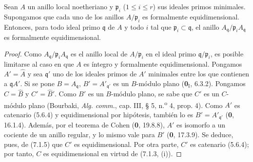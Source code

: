 \begin{lemma}[7.1.7]
\label{IV.2.s7.1.7-fr}
Sean $A$ un anillo local noetheriano y $\mathfrak p_i$
($1\leqslant i\leqslant r$) sus ideales primos minimales.
Supongamos que cada uno de los anillos
$A/\mathfrak p_i$ es formalmente equidimensional.
Entonces, para todo ideal primo $\mathfrak q$ de $A$
y todo $i$ tal que $\mathfrak p_i\subset\mathfrak q$,
el anillo $A_{\mathfrak q}/\mathfrak p_iA_{\mathfrak q}$
es formalmente equidimensional.
\end{lemma}

\begin{proof}
Como $A_{\mathfrak q}/\mathfrak p_iA_{\mathfrak q}$ es
el anillo local de $A/\mathfrak p_i$ en el ideal primo
$\mathfrak q/\mathfrak p_i$, es posible limitarse al
caso en que $A$ es íntegro y formalmente
equidimensional. Pongamos $A'=\widehat A$ y sea
$\mathfrak q'$ uno de los ideales primos de $A'$
minimales entre los que contienen a $\mathfrak qA'$.
Si se pone $B=A_{\mathfrak q}$,
$B'=A'_{\mathfrak q'}$ es un $B$-módulo plano
(\textbf 0$_{\mathrm I}$, 6.3.2). Pongamos $C=\widehat B$
y $C'=\widehat{B}'$. Como $B'$ es un $B$-módulo
plano, se sabe que $C'$ es un $C$-módulo plano
(Bourbaki, \emph{Alg. comm.}, cap. III, § 5,
n.\textsuperscript{o} 4, prop. 4). Como $A'$ es
catenario (5.6.4) y equidimensional por hipótesis,
también lo es $B'=A'_{\mathfrak q'}$ (\textbf 0, 16.1.4).
Además, por el teorema de Cohen (\textbf{0}, 19.8.8),
$A'$ es isomorfo a un cociente de un anillo regular,
y lo mismo vale para $B'$ (\textbf 0, 17.3.9). Se deduce,
pues, de (7.1.5) que $C'$ es equidimensional.
Por otra parte, $C'$ es catenario (5.6.4); por tanto,
$C$ es equidimensional en virtud de (7.1.3, (i)).
\end{proof}
